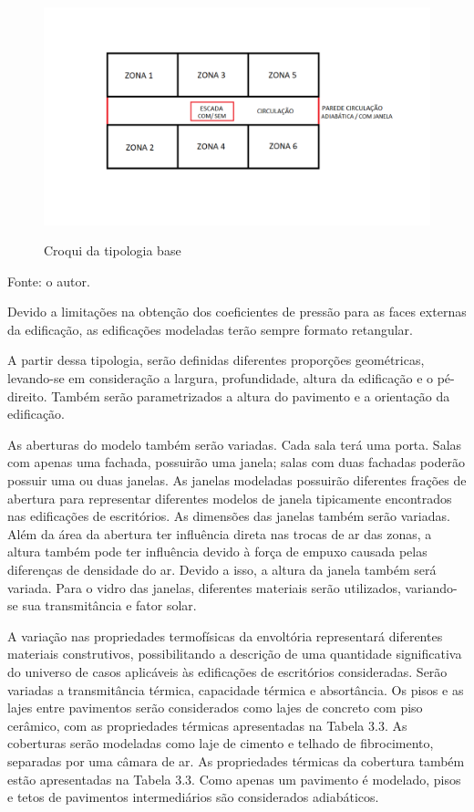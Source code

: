 \documentclass[brazil,hardcopy,openany,a5paper]{ufscthesis}
\begin{document}
	\begin{figure}[h]
		\centering
		\caption{Croqui da tipologia base}
		\includegraphics[width=1\linewidth]{img/CROQUI.png}
		\label{fig:croqui}
	\end{figure}
	\begin{flushleft}
		Fonte: o autor.
	\end{flushleft}
	
	Devido a limitações na obtenção dos coeficientes de pressão para as faces externas da edificação, as edificações modeladas terão sempre formato retangular.
	
	A partir dessa tipologia, serão definidas diferentes proporções geométricas, levando-se em consideração a largura, profundidade, altura da edificação e o pé-direito. Também serão parametrizados a altura do pavimento e a orientação da edificação.
	
	As aberturas do modelo também serão variadas. Cada sala terá uma porta. Salas com apenas uma fachada, possuirão uma janela; salas com duas fachadas poderão possuir uma ou duas janelas. As janelas modeladas possuirão diferentes frações de abertura para representar diferentes modelos de janela tipicamente encontrados nas edificações de escritórios. As dimensões das janelas também serão variadas. Além da área da abertura ter influência direta nas trocas de ar das zonas, a altura também pode ter influência devido à força de empuxo causada pelas diferenças de densidade do ar. Devido a isso, a altura da janela também será variada. Para o vidro das janelas, diferentes materiais serão utilizados, variando-se sua transmitância e fator solar.
	
	A variação nas propriedades termofísicas da envoltória representará diferentes materiais construtivos, possibilitando a descrição de uma quantidade significativa do universo de casos aplicáveis às edificações de escritórios consideradas. Serão variadas a transmitância térmica, capacidade térmica e absortância. Os pisos e as lajes entre pavimentos serão considerados como lajes de concreto com piso cerâmico, com as propriedades térmicas apresentadas na Tabela 3.3. As coberturas serão modeladas como laje de cimento e telhado de fibrocimento, separadas por uma câmara de ar. As propriedades térmicas da cobertura também estão apresentadas na Tabela 3.3. Como apenas um pavimento é modelado, pisos e tetos de pavimentos intermediários são considerados adiabáticos.
	
\end{document}
